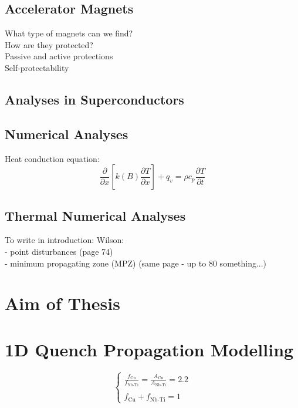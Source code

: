 \documentclass{article}
\begin{document}
\subsection{Accelerator Magnets}
What type of magnets can we find? \\
How are they protected? \\
Passive and active protections \\ 
Self-protectability

\subsection{Analyses in Superconductors}

\subsection{Numerical Analyses}

Heat conduction equation: 
\begin{equation}
    \frac{\partial}{\partial x}[k(B) \frac{\partial T}{\partial x}] + q_v = \rho c_p \frac{\partial T}{\partial t}
\end{equation}



\subsection{Thermal Numerical Analyses}

To write in introduction: 
Wilson: \\
- point disturbances (page 74) \\
- minimum propagating zone (MPZ) (same page - up to 80 something...)

\clearpage
\section{Aim of Thesis}


\clearpage
\section{1D Quench Propagation Modelling}
\label{section: 1d_quench_propagation_modelling}

\begin{equation}
    \left\{ \begin{array}{ll}
    \frac{f_\text{Cu}}{f_\text{Nb-Ti}} = \frac{A_\text{Cu}}{A_\text{Nb-Ti}} = 2.2\\ \\
    f_\text{Cu} + f_\text{Nb-Ti} = 1
    \end{array} \right.
\end{equation}
\end{document}
